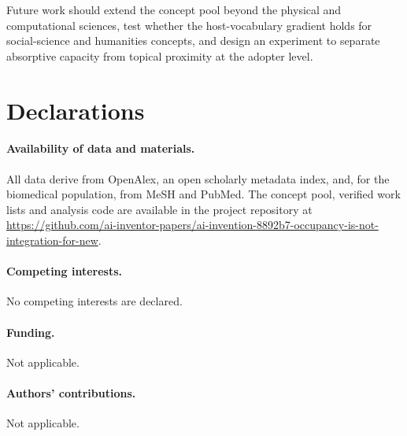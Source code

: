 \documentclass[11pt,letterpaper]{article}
\begin{document}
Future work should extend the concept pool beyond the physical and computational sciences, test whether the
host-vocabulary gradient holds for social-science and humanities concepts, and design an experiment to separate
absorptive capacity from topical proximity at the adopter level.

\section*{Declarations}

\paragraph{Availability of data and materials.} All data derive from OpenAlex, an open scholarly metadata
index, and, for the biomedical population, from MeSH and PubMed. The concept pool, verified work lists and analysis code are available in the project repository at
\url{https://github.com/ai-inventor-papers/ai-invention-8892b7-occupancy-is-not-integration-for-new}.

\paragraph{Competing interests.} No competing interests are declared.

\paragraph{Funding.} Not applicable.

\paragraph{Authors' contributions.} Not applicable.



\end{document}
